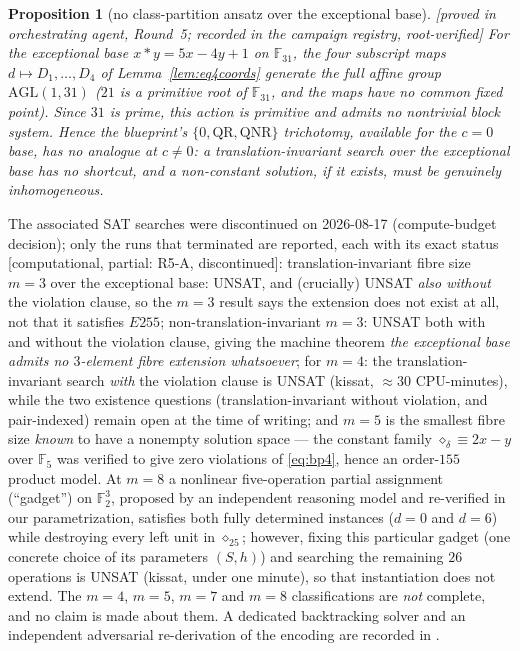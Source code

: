 \documentclass[11pt]{article}
\theoremstyle{plain}
\newtheorem{proposition}[theorem]{Proposition}
\theoremstyle{definition}
\theoremstyle{remark}
\numberwithin{equation}{section}
\newcommand{\F}{\mathbb{F}}
\newcommand{\op}{\mathbin{*}}
\newcommand{\statusbox}[1]{{\small\sloppy\textsf{[#1]}}}
\newcommand{\PROVED}[1]{\statusbox{proved in #1, root-verified}}
\newcommand{\PARTIAL}[1]{\statusbox{computational, partial: #1}}
\begin{document}
\begin{proposition}[no class-partition ansatz over the exceptional base]\label{prop:noblocks}
\PROVED{orchestrating agent, Round~5; recorded in the campaign registry}
For the exceptional base $x\op y = 5x-4y+1$ on $\F_{31}$, the four subscript maps
$d\mapsto D_1,\dots,D_4$ of Lemma~\ref{lem:eq4coords} generate the full affine group
$\mathrm{AGL}(1,31)$ ($21$ is a primitive root of $\F_{31}$, and the maps have no common fixed
point). Since $31$ is prime, this action is primitive and admits no nontrivial block system.
Hence the blueprint's $\{0,\mathrm{QR},\mathrm{QNR}\}$ trichotomy, available for the $c=0$
base, has no analogue at $c\ne 0$: a translation-invariant search over the exceptional base
has no shortcut, and a non-constant solution, if it exists, must be genuinely inhomogeneous.
\end{proposition}

The associated SAT searches were discontinued on 2026-08-17 (compute-budget decision); only
the runs that terminated are reported, each with its exact status \PARTIAL{R5-A, discontinued}:
translation-invariant fibre size $m=3$ over the exceptional base: UNSAT, and (crucially)
UNSAT \emph{also without} the violation clause, so the $m=3$ result says the extension does
not exist at all, not that it satisfies $E255$; non-translation-invariant $m=3$: UNSAT both
with and without the violation clause, giving the machine theorem \emph{the exceptional base
admits no $3$-element fibre extension whatsoever}; for $m=4$: the translation-invariant
search \emph{with} the violation clause is UNSAT (kissat, $\approx 30$ CPU-minutes), while
the two existence questions (translation-invariant without violation, and pair-indexed)
remain open at the time of writing; and $m=5$
is the smallest fibre size \emph{known} to have a nonempty solution space --- the constant
family $\diamond_\delta\equiv 2x-y$ over $\F_5$ was verified to give zero violations of
\eqref{eq:bp4}, hence an order-$155$ product model. At $m=8$ a nonlinear five-operation
partial assignment (``gadget'') on $\F_2^3$, proposed by an independent reasoning model and
re-verified in our parametrization, satisfies both fully determined instances ($d=0$ and
$d=6$) while destroying every left unit in $\diamond_{25}$; however, fixing this particular gadget
(one concrete choice of its parameters $(S,h)$) and searching the remaining $26$ operations
is UNSAT (kissat, under one minute), so that instantiation does not extend. The $m=4$,
$m=5$, $m=7$ and $m=8$ classifications are \emph{not} complete, and no claim is made about
them. A dedicated
backtracking solver and an independent adversarial re-derivation of the encoding are recorded
in \cite{R5A}.
\end{document}
